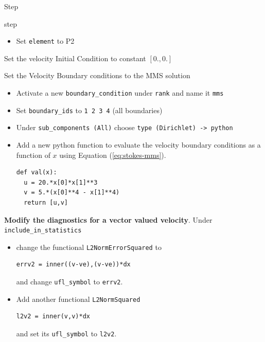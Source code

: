 \begin{steps}{Step}
\begin{steps}{step}
\begin{itemize}{}
    \item Set \texttt{element} to P2
    \end{itemize}
  \item Set the velocity Initial Condition to constant $[0.,0.]$
  \item Set the Velocity Boundary conditions to the MMS solution
    \begin{itemize}
    \item Activate a new \texttt{boundary\_condition} under
      \texttt{rank} and name it \texttt{mms}
    \item Set \texttt{boundary\_ids} to \texttt{1 2 3 4} (all boundaries)
    \item Under \texttt{sub\_components (All)} choose \texttt{type (Dirichlet)
        -> python}
    \item Add a new python function to evaluate the velocity boundary
      conditions as a function of $x$ using Equation (\ref{eq:stokes-mms}).
      \begin{lstlisting}[style=Python]
def val(x):
  u = 20.*x[0]*x[1]**3
  v = 5.*(x[0]**4 - x[1]**4)
  return [u,v]
      \end{lstlisting}
    \end{itemize}
  \item \textbf{Modify the diagnostics for a vector valued velocity}. Under \texttt{include\_in\_statistics}
    \begin{itemize}
    \item change the functional
      \texttt{L2NormErrorSquared} to
      \begin{lstlisting}[style=Ufl]
        errv2 = inner((v-ve),(v-ve))*dx
      \end{lstlisting}
      and change \texttt{ufl\_symbol} to \texttt{errv2}.
    \item Add another functional \texttt{L2NormSquared}
      \begin{lstlisting}[style=Ufl]
        l2v2 = inner(v,v)*dx
      \end{lstlisting}
      and set its \texttt{ufl\_symbol} to \texttt{l2v2}.
    \end{itemize}


\end{steps}
\end{steps}
